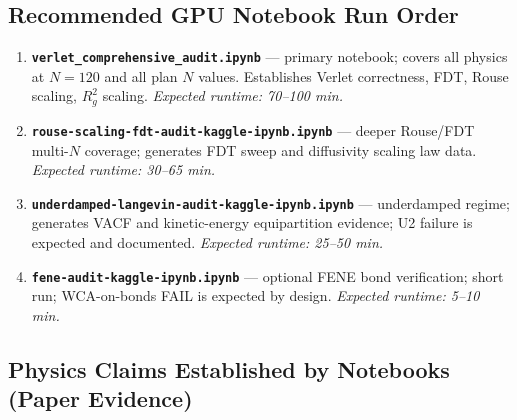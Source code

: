 \documentclass[12pt,a4paper]{article}
\newcommand{\code}[1]{\texttt{#1}}
\begin{document}
\subsection{Recommended GPU Notebook Run Order}

\begin{enumerate}[label=\arabic*.]
  \item \textbf{\code{verlet\_comprehensive\_audit.ipynb}} — primary notebook;
        covers all physics at $N=120$ and all plan $N$ values.
        Establishes Verlet correctness, FDT, Rouse scaling, $R_g^2$ scaling.
        \emph{Expected runtime: 70--100 min.}
  \item \textbf{\code{rouse-scaling-fdt-audit-kaggle-ipynb.ipynb}} — deeper
        Rouse/FDT multi-$N$ coverage; generates FDT sweep and diffusivity
        scaling law data.
        \emph{Expected runtime: 30--65 min.}
  \item \textbf{\code{underdamped-langevin-audit-kaggle-ipynb.ipynb}} —
        underdamped regime; generates VACF and kinetic-energy equipartition
        evidence; U2 failure is expected and documented.
        \emph{Expected runtime: 25--50 min.}
  \item \textbf{\code{fene-audit-kaggle-ipynb.ipynb}} — optional FENE bond
        verification; short run; WCA-on-bonds FAIL is expected by design.
        \emph{Expected runtime: 5--10 min.}
\end{enumerate}

\subsection{Physics Claims Established by Notebooks (Paper Evidence)}
\end{document}
